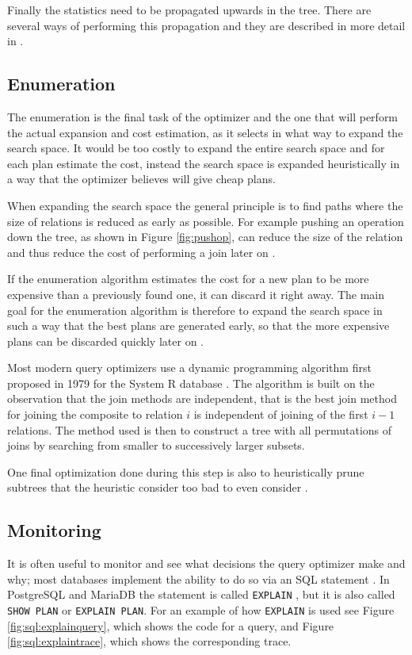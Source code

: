 Finally the statistics need to be propagated upwards in the tree. There are several ways of performing this propagation and they are described in more detail in \cite{chaudhuri_1998_overview_aooqoirs}.

\subsection{Enumeration}
The enumeration is the final task of the optimizer and the one that will perform the actual expansion and cost estimation, as it selects in what way to expand the search space. It would be too costly to expand the entire search space and for each plan estimate the cost, instead the search space is expanded heuristically in a way that the optimizer believes will give cheap plans.

When expanding the search space the general principle is to find paths where the size of relations is reduced as early as possible. For example pushing an operation down the tree, as shown in Figure \ref{fig:pushop}, can reduce the size of the relation and thus reduce the cost of performing a join later on \cite[p. 772-774]{garcia-molina_2002_database_dstcb}.

If the enumeration algorithm estimates the cost for a new plan to be more expensive than a previously found one, it can discard it right away. The main goal for the enumeration algorithm is therefore to expand the search space in such a way that the best plans are generated early, so that the more expensive plans can be discarded quickly later on \cite{nica_2012_analyzing_aqoppojea}.

Most modern query optimizers use a dynamic programming algorithm first proposed in 1979 for the System R database \cite{selinger_1979_access_apsiardms}. The algorithm is built on the observation that the join methods are independent, that is the best join method for joining the composite to relation $i$ is independent of joining of the first $i-1$ relations. The method used is then to construct a tree with all permutations of joins by searching from smaller to successively larger subsets.

One final optimization done during this step is also to heuristically prune subtrees that the heuristic consider too bad to even consider \cite{ono_1990_measuring_mtcojeiqo}.

\subsection{Monitoring}
It is often useful to monitor and see what decisions the query optimizer make and why; most databases implement the ability to do so via an SQL statement \cite[p. 34]{lahdenmaki_2005_relational_rdidatodossea}. In PostgreSQL and MariaDB the statement is called \texttt{EXPLAIN} \cite{postgresql_pd9e} \cite{explain_emkb}, but it is also called \texttt{SHOW PLAN} or \texttt{EXPLAIN PLAN}. For an example of how \texttt{EXPLAIN} is used see Figure \ref{fig:sql:explainquery}, which shows the code for a query, and Figure \ref{fig:sql:explaintrace}, which shows the corresponding trace.

